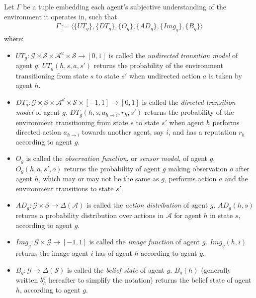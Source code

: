 \begin{definition}[Agents]
\label{def:agentspo}
Let $\Gamma$ be a tuple embedding each agent's subjective understanding of the environment it operates in, such that
\begin{align*}
    \Gamma := \big \langle \{UT_g\}, \{DT_g\},\{O_g\}, \{AD_g\}, \{Img_g\}, \{B_g\} \big \rangle
  \end{align*}
where:
\begin{itemize}
    \item $UT_g : \mathcal{G} \times \mathcal{S} \times \mathcal{A}^u \times \mathcal{S} \rightarrow [0,1]$ is called the \textit{undirected transition model} of agent $g$. $UT_g(h,s,a,s')$ returns the probability of the environment transitioning from state $s$ to state $s'$ when undirected action $a$ is taken by agent $h$.
    \item $DT_g : \mathcal{G} \times \mathcal{S} \times \mathcal{A}^d \times \mathcal{S} \times [-1,1] \rightarrow [0,1]$ is called the \textit{directed transition model} of agent $g$. $DT_g(h,s,a_{h\rightarrow i},r_h,s')$ returns the probability of the environment transitioning from state $s$ to state $s'$ when agent $h$ performs directed action $a_{h\rightarrow i}$ towards another agent, say $i$, and has a reputation $r_h$ according to agent $g$.
    
    \item $O_g$ is called the \textit{observation function}, or \textit{sensor model}, of agent $g$. $O_g(h,a,s',o)$ returns the probability of agent $g$ making observation $o$ after agent $h$, which may or may not be the same as $g$, performs action $a$ and the environment transitions to state $s'$.
    \item $AD_g : \mathcal{G} \times \mathcal{S} \rightarrow \Delta(\mathcal{A})$ is called the \textit{action distribution} of agent $g$. $AD_g(h,s)$ returns a probability distribution over actions in $\mathcal{A}$ for agent $h$ in state $s$, according to agent $g$.
    \item $Img_g : \mathcal{G} \times \mathcal{G} \rightarrow [-1,1]$ is called the \textit{image function} of agent $g$. $Img_g(h,i)$ returns the image agent $i$ has of agent $h$ according to agent $g$.
    \item $B_g : \mathcal{G} \rightarrow \Delta(\mathcal{S})$ is called the \textit{belief state} of agent $g$. $B_g(h)$ (generally written $b_h^g$ hereafter to simplify the notation) returns the belief state of agent $h$, according to agent $g$.
\end{itemize}
\end{definition}
